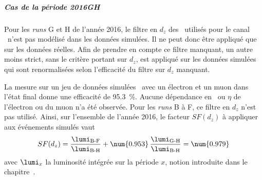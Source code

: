 \subparagraph{Cas de la période 2016GH}
Pour les \emph{runs} G et H de l'année 2016, le filtre en $d_z$ des \HLTpaths\ utilisés pour le canal \ele\mu\ n'est pas modélisé dans les données simulées.
Il ne peut donc être appliqué que sur les données réelles.
Afin de prendre en compte ce filtre manquant, un autre moins strict, sans le critère portant sur $d_z$, est appliqué sur les données simulées qui sont renormalisées selon l'efficacité du filtre sur $d_z$ manquant.
\par
La mesure sur un jeu de données simulées \ttbar\ avec un électron et un muon dans l'état final donne une efficacité de \SI{95.3}{\%}.
Aucune dépendance en \pT\ ou $\eta$ de l'électron ou du muon n'a été observée.
Pour les \emph{runs} B à F, ce filtre en $d_z$ n'est pas utilisé.
Ainsi, sur l'ensemble de l'année 2016, le facteur $SF(d_z)$ à appliquer aux événements simulés vaut
\begin{equation}
SF(d_z) = \frac{\lumi_\text{B-F}}{\lumi_\text{B-H}} + \num{0.953}\,\frac{\lumi_\text{G-H}}{\lumi_\text{B-H}} = \num{0.979}
\end{equation}
avec $\lumi_x$ la luminosité intégrée sur la période $x$, notion introduite dans le chapitre~.

